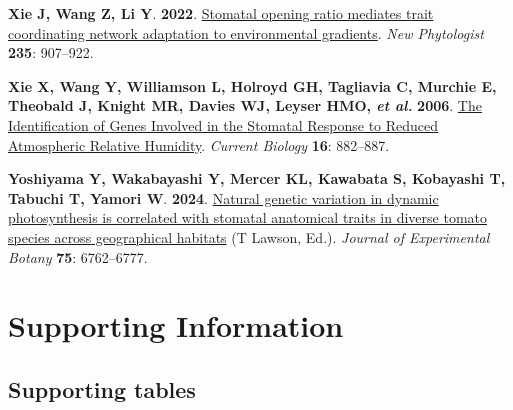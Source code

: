 \documentclass[
  letterpaper,
  DIV=11,
  numbers=noendperiod]{scrartcl}
\newlength{\cslhangindent}
\newenvironment{CSLReferences}[2] %
 {\begin{list}{}{%
  \setlength{\itemindent}{0pt}
  \setlength{\leftmargin}{0pt}
  \setlength{\parsep}{0pt}
  \ifodd #1
   \setlength{\leftmargin}{\cslhangindent}
   \setlength{\itemindent}{-1\cslhangindent}
  \fi
  \setlength{\itemsep}{#2\baselineskip}}}
 {\end{list}}
\begin{document}
\begin{CSLReferences}{0}{1}
\textbf{\textbf{Xie J}, \textbf{Wang Z}, \textbf{Li Y}}. \textbf{2022}.
\href{https://doi.org/10.1111/nph.18189}{Stomatal opening ratio mediates
trait coordinating network adaptation to environmental gradients}.
\emph{New Phytologist} \textbf{235}: 907--922.

\textbf{\textbf{Xie X}, \textbf{Wang Y}, \textbf{Williamson L},
\textbf{Holroyd GH}, \textbf{Tagliavia C}, \textbf{Murchie E},
\textbf{Theobald J}, \textbf{Knight MR}, \textbf{Davies WJ},
\textbf{Leyser HMO}, \emph{et al.}} \textbf{2006}.
\href{https://doi.org/10.1016/j.cub.2006.03.028}{The {Identification} of
{Genes Involved} in the {Stomatal Response} to {Reduced Atmospheric
Relative Humidity}}. \emph{Current Biology} \textbf{16}: 882--887.

\textbf{\textbf{Yoshiyama Y}, \textbf{Wakabayashi Y}, \textbf{Mercer
KL}, \textbf{Kawabata S}, \textbf{Kobayashi T}, \textbf{Tabuchi T},
\textbf{Yamori W}}. \textbf{2024}.
\href{https://doi.org/10.1093/jxb/erae082}{Natural genetic variation in
dynamic photosynthesis is correlated with stomatal anatomical traits in
diverse tomato species across geographical habitats} (T Lawson, Ed.).
\emph{Journal of Experimental Botany} \textbf{75}: 6762--6777.

\end{CSLReferences}

\newpage{}

\section{Supporting Information}\label{supporting-information}

\renewcommand{\thefigure}{S\arabic{figure}}
\renewcommand{\thetable}{S\arabic{table}}
\renewcommand{\theequation}{S\arabic{equation}}
\setcounter{figure}{0}
\setcounter{table}{0}
\setcounter{equation}{0}
\setcounter{page}{1}
\FloatBarrier

\subsection{Supporting tables}\label{supporting-tables}
\end{document}
